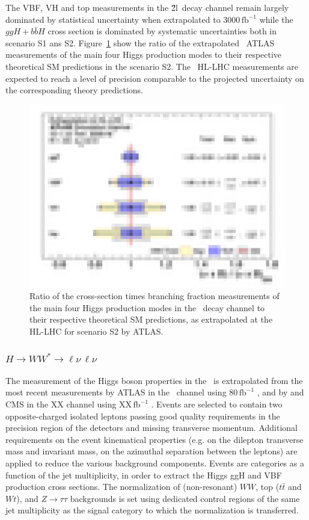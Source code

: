 The VBF, VH and top measurements in the \H2l\ decay channel remain largely dominated by statistical uncertainty when extrapolated to 3000\,$\mathrm{fb}^{-1}$ while the $ggH+b\bar{b}H$ cross section is dominated by systematic uncertainties both in scenario S1 ans S2.
%
Figure~\ref{fig:HZZ_ATLAS_HLLHC_S2} show the ratio of the extrapolated \HZZ\ ATLAS measurements of the main four Higgs production modes to their respective theoretical SM predictions in the scenario S2. The  \HZZ\ HL-LHC measurements are expected to  reach a level of precision comparable to the projected uncertainty on the corresponding theory predictions.

\begin{figure}
  \centering
  \includegraphics[width=0.6\linewidth]{section2/plots/channels/ATLAS_HZZ_compareToSM_prodXS}
  \caption{Ratio of the cross-section times branching fraction measurements of the main four Higgs production modes in the \HZZ\ decay channel to their respective theoretical SM predictions, as extrapolated at the HL-LHC for scenario S2 by ATLAS.}
  \label{fig:HZZ_ATLAS_HLLHC_S2}
\end{figure}

\subsubsection{$H \to WW^* \to \ell\nu\,\ell\nu$}

The measurement of the Higgs boson properties in the \HZZ\ is extrapolated from the most recent measurements by ATLAS in the \HWW\ channel using 80\,$\mathrm{fb}^{-1}$ \cite{Aaboud:2018jqu}, and by and CMS in the XX channel using XX\,$\mathrm{fb}^{-1}$ \cite{}.
Events are selected to contain two opposite-charged isolated leptons passing good quality requirements in the precision region of the detectors and missing transverse momentum. Additional requirements on the event kinematical properties (e.g. on the dilepton transverse mass and invariant mass, on the azimuthal separation between the leptons) are applied to reduce the various background components. Events are categories as a function of the jet multiplicity, in order to extract the Higgs ggH and VBF production cross sections. The normalization of (non-resonant) $WW$, top ($t\bar{t}$ and $Wt$), and $Z\rightarrow\tau\tau$ backgrounds is set using dedicated control regions of the same jet multiplicity as the signal category to which the normalization is transferred.

